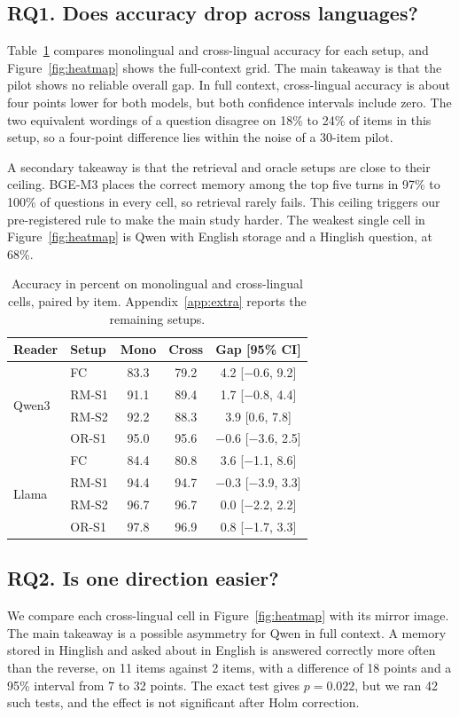 \documentclass[11pt]{article}
\begin{document}
\subsection{RQ1. Does accuracy drop across languages?}
Table~\ref{tab:gap} compares monolingual and cross-lingual accuracy for each setup, and Figure~\ref{fig:heatmap} shows the full-context grid.
The main takeaway is that the pilot shows no reliable overall gap.
In full context, cross-lingual accuracy is about four points lower for both models, but both confidence intervals include zero.
The two equivalent wordings of a question disagree on 18\% to 24\% of items in this setup, so a four-point difference lies within the noise of a 30-item pilot.

A secondary takeaway is that the retrieval and oracle setups are close to their ceiling.
BGE-M3 places the correct memory among the top five turns in 97\% to 100\% of questions in every cell, so retrieval rarely fails.
This ceiling triggers our pre-registered rule to make the main study harder.
The weakest single cell in Figure~\ref{fig:heatmap} is Qwen with English storage and a Hinglish question, at 68\%.

\begin{table}[t]
\centering\small\setlength{\tabcolsep}{4pt}
\begin{tabular}{llccc}
\toprule
Reader & Setup & Mono & Cross & Gap [95\% CI] \\
\midrule
\multirow{4}{*}{Qwen3} & FC & 83.3 & 79.2 & 4.2 [$-$0.6, 9.2] \\
 & RM-S1 & 91.1 & 89.4 & 1.7 [$-$0.8, 4.4] \\
 & RM-S2 & 92.2 & 88.3 & 3.9 [0.6, 7.8] \\
 & OR-S1 & 95.0 & 95.6 & $-$0.6 [$-$3.6, 2.5] \\
\midrule
\multirow{4}{*}{Llama} & FC & 84.4 & 80.8 & 3.6 [$-$1.1, 8.6] \\
 & RM-S1 & 94.4 & 94.7 & $-$0.3 [$-$3.9, 3.3] \\
 & RM-S2 & 96.7 & 96.7 & 0.0 [$-$2.2, 2.2] \\
 & OR-S1 & 97.8 & 96.9 & 0.8 [$-$1.7, 3.3] \\
\bottomrule
\end{tabular}
\caption{Accuracy in percent on monolingual and cross-lingual cells, paired by item. Appendix~\ref{app:extra} reports the remaining setups.}
\label{tab:gap}
\end{table}

\subsection{RQ2. Is one direction easier?}
We compare each cross-lingual cell in Figure~\ref{fig:heatmap} with its mirror image.
The main takeaway is a possible asymmetry for Qwen in full context.
A memory stored in Hinglish and asked about in English is answered correctly more often than the reverse, on 11 items against 2 items, with a difference of 18 points and a 95\% interval from 7 to 32 points.
The exact test gives $p=0.022$, but we ran 42 such tests, and the effect is not significant after Holm correction.
\end{document}
